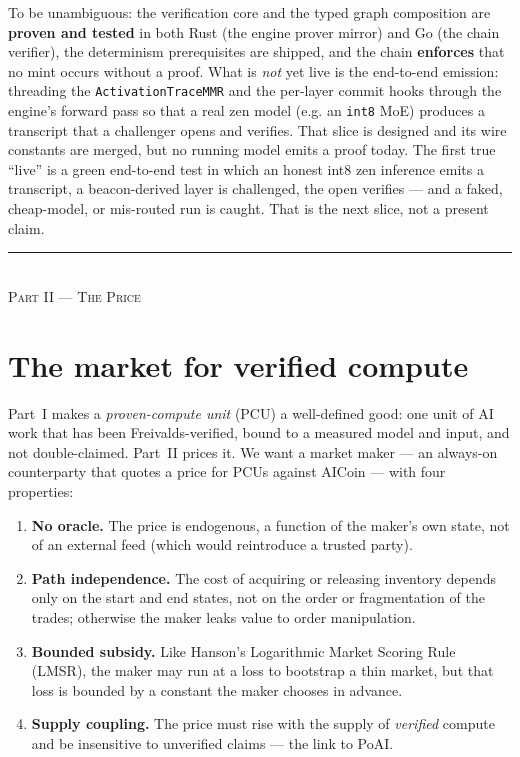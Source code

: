 \documentclass[11pt]{article}
\newcommand{\code}[1]{\texttt{#1}}
\begin{document}
To be unambiguous: the verification core and the typed graph composition are
\textbf{proven and tested} in both Rust (the engine prover mirror) and Go (the
chain verifier), the determinism prerequisites are shipped, and the chain
\textbf{enforces} that no mint occurs without a proof. What is \emph{not} yet live
is the end-to-end emission: threading the \code{ActivationTraceMMR} and the
per-layer commit hooks through the engine's forward pass so that a real zen model
(e.g. an \code{int8} MoE) produces a transcript that a challenger opens and
verifies. That slice is designed and its wire constants are merged, but no running
model emits a proof today. The first true ``live'' is a green end-to-end test in
which an honest int8 zen inference emits a transcript, a beacon-derived layer is
challenged, the open verifies --- and a faked, cheap-model, or mis-routed run is
caught. That is the next slice, not a present claim.

\begin{center}\rule{0.5\linewidth}{0.4pt}\\[-0.2em]\textsc{Part II --- The Price}\end{center}

\section{The market for verified compute}
\label{sec:hmm-intro}

Part~I makes a \emph{proven-compute unit} (PCU) a well-defined good: one unit of AI
work that has been Freivalds-verified, bound to a measured model and input, and
not double-claimed. Part~II prices it. We want a market maker --- an always-on
counterparty that quotes a price for PCUs against AICoin --- with four properties:

\begin{enumerate}[leftmargin=1.6em]
  \item \textbf{No oracle.} The price is endogenous, a function of the maker's own
        state, not of an external feed (which would reintroduce a trusted party).
  \item \textbf{Path independence.} The cost of acquiring or releasing inventory
        depends only on the start and end states, not on the order or
        fragmentation of the trades; otherwise the maker leaks value to order
        manipulation.
  \item \textbf{Bounded subsidy.} Like Hanson's Logarithmic Market Scoring Rule
        (LMSR), the maker may run at a loss to bootstrap a thin market, but that
        loss is bounded by a constant the maker chooses in advance.
  \item \textbf{Supply coupling.} The price must rise with the supply of
        \emph{verified} compute and be insensitive to unverified claims --- the
        link to PoAI.
\end{enumerate}
\end{document}
